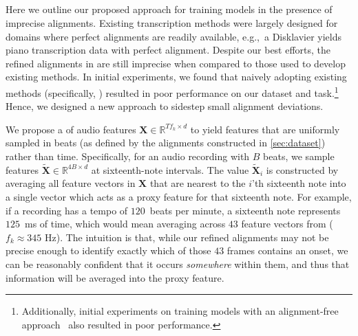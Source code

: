 \subsection{\Beatpooling}
\label{sec:beatpool}

Here we outline our proposed approach for training models in the presence of imprecise alignments. 
Existing transcription methods were largely designed for domains where perfect alignments are readily available, e.g.,~a Disklavier yields piano transcription data with perfect alignment. 
Despite our best efforts, the refined alignments in \hooktheory{} are still imprecise when compared to those used to develop existing methods. 
In initial experiments, we found that naively adopting existing methods (specifically, \cite{hawthorne2017onsets,hawthorne2021sequence}) resulted in poor performance on our dataset and task.\footnote{Additionally, initial experiments on training models with an alignment-free approach~\cite{graves2006connectionist} also resulted in poor performance.} 
Hence, we designed a new approach to sidestep small alignment deviations.

We propose a \emph{\beatpooling} of audio features $\bm{X} \in \mathbb{R}^{Tf_k \times d}$ to yield features that are uniformly sampled in beats (as defined by the alignments constructed in \cref{sec:dataset}) rather than time. 
Specifically, for an audio recording with $B$ beats, we sample features $\tilde{\bm{X}} \in \mathbb{R}^{4B \times d}$ at sixteenth-note intervals. The value $\tilde{\bm{X}}_i$ is constructed by averaging all feature vectors in $\bm{X}$ that are nearest to the $i$'th sixteenth note into a single vector which acts as a proxy feature for that sixteenth note. 
For example, if a recording has a tempo of $120$~beats per minute, a sixteenth note represents $125$~ms of time, which would mean averaging across 
$43$ feature vectors from \jukebox{} (${f_k \approx 345}$ Hz). 
The intuition is that, while our refined alignments may not be precise enough to identify exactly which of those $43$ frames contains an onset, we can be reasonably confident that it occurs \emph{somewhere} within them, and thus that information will be averaged into the proxy feature.


